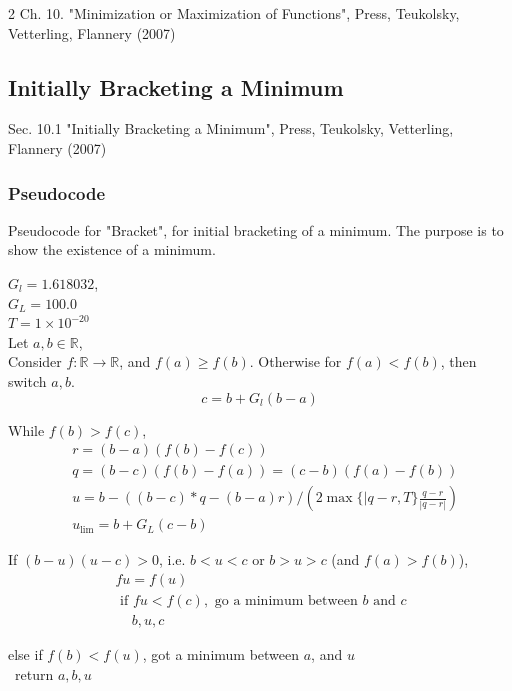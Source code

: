 \documentclass[10pt]{amsart}
\begin{document}
\begin{multicols*}{2}
Ch. 10. "Minimization or Maximization of Functions", Press, Teukolsky, Vetterling, Flannery (2007) \cite{PTVF2007}

\subsection{Initially Bracketing a Minimum}

Sec. 10.1 "Initially Bracketing a Minimum", Press, Teukolsky, Vetterling, Flannery (2007) \cite{PTVF2007}

\subsubsection{Pseudocode}

Pseudocode for "Bracket", for initial bracketing of a minimum. The purpose is to show the existence of a minimum.

$G_l = 1.618032$, \\
$G_L = 100.0$ \\
$T = 1\times 10^{-20}$ \\

Let $a,b \in \mathbb{R}$, \\
Consider $f: \mathbb{R} \to \mathbb{R}$, and $f(a) \geq f(b)$. Otherwise for $f(a) < f(b)$, then switch $a,b$.
\[
c = b + G_l (b-a)
\]

While $f(b) > f(c)$, \\
\[
\begin{aligned} 
& r = (b-a)(f(b) - f(c)) \\
& q = (b-c)(f(b) - f(a)) = (c-b)(f(a) - f(b)) \\
& u = b - ((b-c)* q - (b-a) r) / (2 \max{ \lbrace|q-r, T\rbrace} \frac{q-r}{ |q-r| } ) \\
& u_{\text{lim}} = b + G_L ( c-b)
\end{aligned}
\]

If $(b - u )(u-c) > 0$, i.e. $b<u <c$ or $b> u > c$ (and $f(a) > f(b)$), \\
\[
\begin{aligned}
& fu = f(u) \\
& \text{ if } fu < f(c), \text{ go a minimum between $b$ and $c$ } \\
& \quad \, b, u, c
\end{aligned}
\]

else if $f(b) < f(u)$, got a minimum between $a$, and $u$ \\
\quad \, return $a,b,u$ \\


\end{multicols*}
\end{document}
